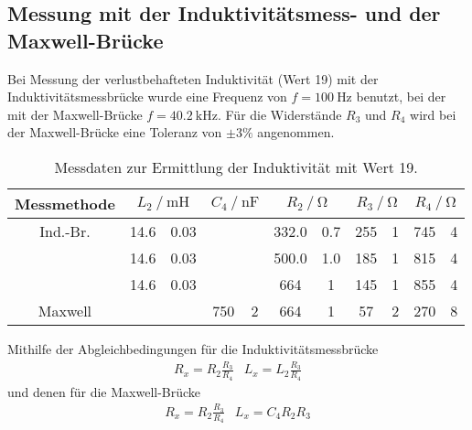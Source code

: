 \subsection{Messung mit der Induktivitätsmess- und der Maxwell-Brücke}
    Bei Messung der verlustbehafteten Induktivität (Wert 19) mit der Induktivitätsmessbrücke wurde eine Frequenz 
    von $f=\SI{100}{\hertz}$ benutzt, 
    bei der mit der Maxwell-Brücke $f=\SI{40.2}{\kilo\hertz}$.
    Für die Widerstände $R_3$ und $R_4$ wird bei der Maxwell-Brücke eine Toleranz von $\pm{3\%}$ angenommen.  
    \begin{table}
        \centering
        \caption{Messdaten zur Ermittlung der Induktivität mit Wert 19.}
        \label{tab:indumess}
        \begin{tabular}{c 
                        S[table-format=2.1] @{${}\pm{}$} S[table-format=1.2] 
                        S[table-format=3.0] @{${}\pm{}$} S[table-format=1.0] 
                        S[table-format=3.1] @{${}\pm{}$} S[table-format=1.1] 
                        S[table-format=3.0] @{${}\pm{}$} S[table-format=1.0]  
                        S[table-format=3.0] @{${}\pm{}$} S[table-format=1.0]}
            \toprule
            {Messmethode} 
            &  
            &  
            &  
            &  
            &  \\
            \midrule
            Ind.-Br.    & 14.6 & 0.03 & & & 332.0   & 0.7   & 255 & 1   & 745 & 4 \\
                        & 14.6 & 0.03 & & & 500.0   & 1.0   & 185 & 1   & 815 & 4 \\
                        & 14.6 & 0.03 & & & 664     & 1     & 145 & 1   & 855 & 4 \\
            Maxwell     & & & 750 & 2     & 664     & 1     & 57  & 2   & 270 & 8 \\
            \bottomrule
        \end{tabular}
    \end{table}
    Mithilfe der Abgleichbedingungen für die Induktivitätsmessbrücke 
    \begin{align}
        R_x=R_2 \frac{R_3}{R_4}
        &L_x=L_2 \frac{R_3}{R_4}
    \end{align}
    und denen für die Maxwell-Brücke 
    \begin{align}
        R_x=R_2 \frac{R_3}{R_4}
        &L_x=C_4 R_2 R_3
    \end{align}
